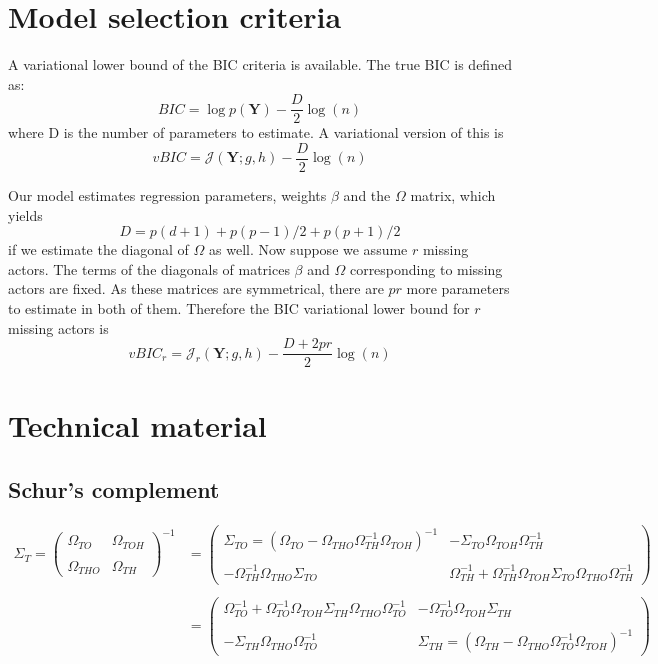 \documentclass[11pt,a4paper]{article}
\newcommand{\Ybf}{\boldsymbol{Y}}
\newcommand{\bound}{\mathcal{J}}
\begin{document}
\section{Model selection criteria}

A variational lower bound of the BIC criteria is available. The true BIC is defined as:
$$ BIC = \log p(\Ybf) - \frac{D}{2} \log(n) $$
where D is the number of parameters to estimate. A variational version of this is 
$$vBIC = \bound(\Ybf; g,h) - \frac{D}{2} \log(n)  $$

Our model estimates regression parameters, weights $\beta$ and the $\Omega$ matrix, which yields
$$D = p(d+1) + p(p-1)/2 + p(p+1)/2 $$
if we estimate the diagonal of $\Omega$ as well.
Now suppose we assume $r$ missing actors. The terms of the diagonals of matrices $\beta$ and $\Omega$ corresponding to missing actors are fixed. As these matrices are symmetrical,  there are $pr$ more parameters to estimate in both of them. Therefore the BIC variational lower bound for $r$ missing actors is
$$ vBIC_r=\bound_r(\Ybf; g,h) - \frac{D+2pr}{2} \log(n)  $$
 
\newpage


\appendix
\section{Technical material}
\subsection{Schur's complement}
\begin{align*}
 \Sigma_T=
  \left( {\begin{array}{cc}
  \Omega_{TO} &  \Omega_{TOH}\\\\
  \Omega_{THO} & \Omega_{TH}
  \end{array} } \right)^{-1} &=
  \left( {\begin{array}{cc}
  \Sigma_{TO} =( \Omega_{TO} - \Omega_{THO}\Omega_{TH}^{-1}\Omega_{TOH})^{-1} &  - \Sigma_{TO} \Omega_{TOH}\Omega_{TH}^{-1}\\\\
 -\Omega_{TH}^{-1}\Omega_{THO}\Sigma_{TO} & \Omega_{TH}^{-1}+\Omega_{TH}^{-1}\Omega_{TOH}\Sigma_{TO}\Omega_{THO}\Omega_{TH}^{-1}
  \end{array} } \right)\\\\
  &=   \left( {\begin{array}{cc}
   \Omega_{TO}^{-1}+\Omega_{TO}^{-1}\Omega_{TOH}\Sigma_{TH}\Omega_{THO}\Omega_{TO}^{-1} & -\Omega_{TO}^{-1}\Omega_{TOH}\Sigma_{TH} \\\\
    -\Sigma_{TH}\Omega_{THO}\Omega_{TO}^{-1}&  \Sigma_{TH}= (\Omega_{TH} - \Omega_{THO}\Omega_{TO}^{-1}\Omega_{TOH})^{-1} 
   \end{array} } \right)
\end{align*}
  
\end{document}

